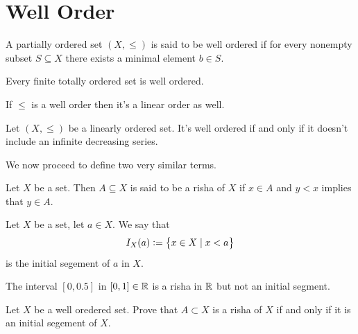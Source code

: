 \documentclass[11pt,a4paper]{article}
\begin{document}
\newpage

\section{Well Order}
\begin{definition}
A partially ordered set $(X,\le)$ is said to be well ordered if for every 
nonempty subset $S \subseteq X$ there exists a minimal element $b \in S$.
\end{definition}

\begin{proposition}
  Every finite totally ordered set is well ordered.
\end{proposition}

\begin{proposition}
  If $\le$ is a well order then it's a linear order as well.
\end{proposition}

\begin{proposition}
  Let  $(X,\le)$ be a linearly ordered set. It's well ordered
  if and only if it doesn't include an infinite decreasing series.
\end{proposition}

We now proceed to define two very similar terms.
\begin{definition}[Risha]
Let $X$ be a set.
Then $A \subseteq X$ is said to be a risha of $X$
if $x \in A$ and $y < x$ implies that $y \in A$.
\end{definition}

\begin{definition}
  Let $X$ be a set, let $a \in X$.
  We say that
  \[
    I_X(a) := \left\{x \in X \mid x < a\right\}
  \]
  is the initial segement of $a$ in $X$.
\end{definition}

\begin{remark}
The interval $[0,0.5]$ in $[0,1]\in\mathbb{R}$ is a risha in $\mathbb{R}$ but not an initial 
segment.
\end{remark}

\begin{proposition}
  Let $X$ be a well oredered set.
  Prove that $A \subset X$ is a risha of $X$ if and only if it is an
  initial segement of $X$.
\end{proposition}
\end{document}
